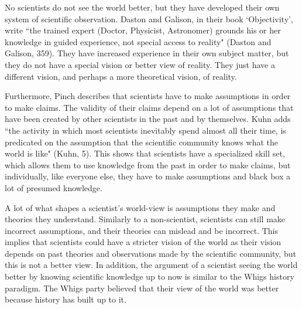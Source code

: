 \documentclass[11pt, oneside]{article}
\begin{document}
\par No scientists do not see the world better, but they have developed their own system of scientific observation. Daston and Galison, in their book `Objectivity', write ``the trained expert (Doctor, Physicist, Astronomer) grounds his or her knowledge in guided experience, not special access to reality" (Daston and Galison, 359). They have increased experience in their own subject matter, but they do not have a special vision or better view of reality. They just have a different vision, and perhaps a more theoretical vision, of reality.

\par Furthermore, Pinch describes that scientists have to make assumptions in order to make claims. The validity of their claims depend on a lot of assumptions that have been created by other scientists in the past and by themselves. Kuhn adds ``the activity in which most scientists inevitably spend almost all their time, is predicated on the assumption that the scientific community knows what the world is like" (Kuhn, 5). This shows that scientists have a specialized skill set, which allows them to use knowledge from the past in order to make claims, but individually, like everyone else, they have to make assumptions and black box a lot of presumed knowledge. 

\par A lot of what shapes a scientist's world-view is assumptions they make and theories they understand. Similarly to a non-scientist, scientists can still make incorrect assumptions, and their theories can mislead and be incorrect. This implies that scientists could have a stricter vision of the world as their vision depends on past theories and observations made by the scientific community, but this is not a better view. In addition, the argument of a scientist seeing the world better by knowing scientific knowledge up to now is similar to the Whigs history paradigm. The Whigs party believed that their view of the world was better because history has built up to it. 
\end{document}
